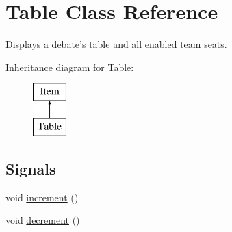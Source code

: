 \hypertarget{classTable}{\section{Table Class Reference}
\label{classTable}
}


Displays a debate's table and all enabled team seats.  


Inheritance diagram for Table\-:\begin{figure}[H]
\begin{center}
\leavevmode
\includegraphics[height=2.000000cm]{classTable}
\end{center}
\end{figure}
\subsection*{Signals}
\begin{DoxyCompactItemize}
\item 
void \hyperlink{classTable_a6d82e2f7c1b669222fd22ad42f5b92c8}{increment} ()
\item 
void \hyperlink{classTable_ab6d6f8837a696567a11b509357529954}{decrement} ()
\end{DoxyCompactItemize}
